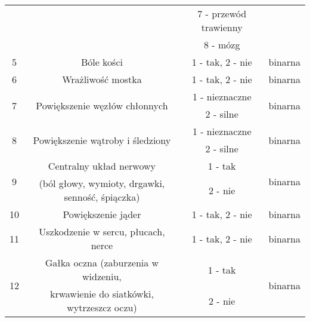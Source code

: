 \documentclass{article}
\begin{document}
\begin{center}
\begin{longtable}{ |c|c|c|c| }
                    &                                                     & 7 - przewód trawienny                 &                            \\
                    &                                                     & 8 - mózg                              &                            \\ \hline
5                   & Bóle kości                                          & 1 - tak, 2 - nie                      & binarna                    \\ \hline
6                   & Wrażliwość mostka                                   & 1 - tak, 2 - nie                      & binarna                    \\ \hline
\multirow{2}{*}{7}  & \multirow{2}{*}{Powiększenie węzłów chłonnych}      & 1 - nieznaczne                        & \multirow{2}{*}{binarna}   \\
                    &                                                     & 2 - silne                             &                            \\ \hline
\multirow{2}{*}{8}  & \multirow{2}{*}{Powiększenie wątroby i śledziony}   & 1 - nieznaczne                        & \multirow{2}{*}{binarna}   \\
                    &                                                     & 2 - silne                             &                            \\ \hline
\multirow{2}{*}{9}  & Centralny układ nerwowy                             & 1 - tak                               & \multirow{2}{*}{binarna}   \\
                    & (ból głowy, wymioty, drgawki, senność, śpiączka)    & 2 - nie                               &                            \\ \hline
10                  & Powiększenie jąder                                  & 1 - tak, 2 - nie                      & binarna                    \\ \hline
11                  & Uszkodzenie w sercu, płucach, nerce                 & 1 - tak, 2 - nie                      & binarna                    \\ \hline
\multirow{2}{*}{12} & Gałka oczna (zaburzenia w widzeniu,                 & 1 - tak                               & \multirow{2}{*}{binarna}   \\
                    & krwawienie do siatkówki, wytrzeszcz oczu)           & 2 - nie                               &                            \\ \hline

\end{longtable}
\end{center}
\end{document}
